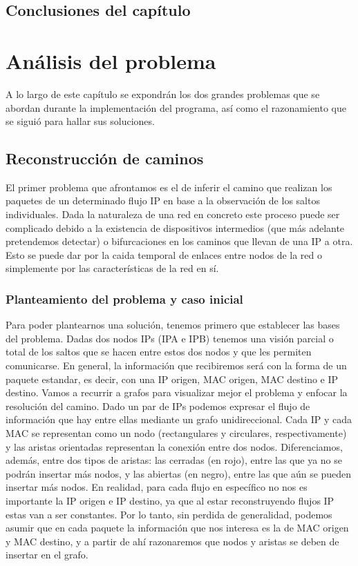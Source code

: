 \documentclass[twoside, 12pt]{epstfg}
\begin{document}
\section{Conclusiones del capítulo}

\chapter{Análisis del problema}
\label{chap:Analisis}
A lo largo de este capítulo se expondrán los dos grandes problemas que se abordan durante la implementación del programa, así como el razonamiento que se siguió para hallar sus soluciones. 

\section{Reconstrucción de caminos}
El primer problema que afrontamos es el de inferir el camino que realizan los paquetes de un determinado flujo IP en base a la observación de los saltos individuales. Dada la naturaleza de una red en concreto este proceso puede ser complicado debido a la existencia de dispositivos intermedios (que más adelante pretendemos detectar) o bifurcaciones en los caminos que llevan de una IP a otra. Esto se puede dar por la caida temporal de enlaces entre nodos de la red o simplemente por las características de la red en sí.

\subsection{Planteamiento del problema y caso inicial}
Para poder plantearnos una solución, tenemos primero que establecer las bases del problema. Dadas dos nodos IPs (IPA e IPB) tenemos una visión parcial o total de los saltos que se hacen entre estos dos nodos y que les permiten comunicarse. En general, la información que recibiremos será con la forma de un paquete estandar, es decir, con una IP origen, MAC origen, MAC destino e IP destino. Vamos a recurrir a grafos para visualizar mejor el problema y enfocar la resolución del camino. Dado un par de IPs podemos expresar el flujo de información que hay entre ellas mediante un grafo unidireccional. Cada IP y cada MAC se representan como un nodo (rectangulares y circulares, respectivamente) y las aristas orientadas representan la conexión entre dos nodos. Diferenciamos, además, entre dos tipos de aristas: las cerradas (en rojo), entre las que ya no se podrán insertar más nodos, y las abiertas (en negro), entre las que aún se pueden insertar más nodos. En realidad, para cada flujo en específico no nos es importante la IP origen e IP destino, ya que al estar reconstruyendo flujos IP estas van a ser constantes. Por lo tanto, sin perdida de generalidad, podemos asumir que en cada paquete la información que nos interesa es la de MAC origen y MAC destino, y a partir de ahí razonaremos que nodos y aristas se deben de insertar en el grafo. 
\end{document}
